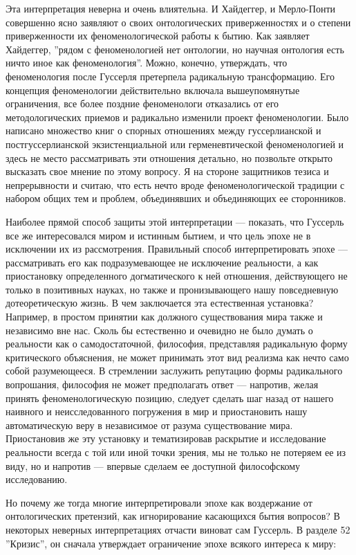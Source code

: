 \documentclass[11pt]{book}
\begin{document}
Эта интерпретация неверна и очень влиятельна. И Хайдеггер, и Мерло-Понти совершенно ясно заявляют о своих онтологических приверженностях и о степени приверженности их феноменологической работы к бытию. Как заявляет Хайдеггер, ''рядом с феноменологией нет онтологии, но научная онтология есть ничто иное как феноменология''. Можно, конечно, утверждать, что феноменология после Гуссерля претерпела радикальную трансформацию. Его концепция феноменологии действительно включала вышеупомянутые ограничения, все более поздние феноменологи отказались от его методологических приемов и радикально изменили проект феноменологии. Было написано множество книг о спорных отношениях между гуссерлианской и постгуссерлианской экзистенциальной или герменевтической феноменологией и здесь не место рассматривать эти отношения детально, но позвольте открыто высказать свое мнение по этому вопросу. Я на стороне защитников тезиса и непрерывности и считаю, что есть нечто вроде феноменологической традиции с набором общих тем и проблем, объединявших и объединяющих ее сторонников.

Наиболее прямой способ защиты этой интерпретации --- показать, что Гуссерль все же интересовался миром и истинным бытием, и что цель эпохе не в исключении их из рассмотрения. Правильный способ интерпретировать эпохе --- рассматривать его как подразумевающее не исключение реальности, а как приостановку определенного догматического к ней отношения, действующего не только в позитивных науках, но также и пронизывающего нашу повседневную дотеоретическую жизнь. В чем заключается эта естественная установка? Например, в простом принятии как должного существования мира также и независимо вне нас. Сколь бы естественно и очевидно не было думать о реальности как о самодостаточной, философия, представляя радикальную форму критического объяснения, не может принимать этот вид реализма как нечто само собой разумеющееся. В стремлении заслужить репутацию формы радикального вопрошания, философия не может предполагать ответ --- напротив, желая принять феноменологическую позицию, следует сделать шаг назад от нашего наивного и неисследованного погружения в мир и приостановить нашу автоматическую веру в независимое от разума существование мира. Приостановив же эту установку и тематизировав раскрытие и исследование реальности всегда с той или иной точки зрения, мы не только не потеряем ее из виду, но и напротив --- впервые сделаем ее доступной философскому исследованию.

Но почему же тогда многие интерпретировали эпохе как воздержание от онтологических претензий, как игнорирование касающихся бытия вопросов? В некоторых неверных интерпретациях отчасти виноват сам Гуссерль. В разделе 52 ''Кризис'', он сначала утверждает ограничение эпохе всякого интереса к миру:
\end{document}
